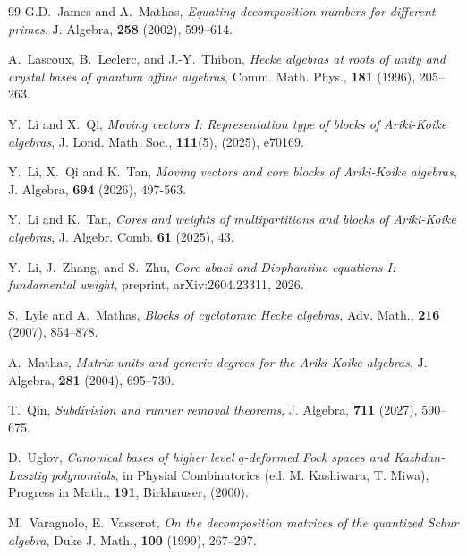 \documentclass[a4paper,10pt]{amsart}
\theoremstyle{plain}
\theoremstyle{plain}
\numberwithin{equation}{section}
\begin{document}
\begin{thebibliography}{99}
{\sc G.D.~James and A.~Mathas}, {\em Equating decomposition numbers for different primes}, {J. Algebra},  {\textbf{258}} (2002), 599--614.

{\sc A.~Lascoux, B.~Leclerc, and J.-Y.~Thibon}, {\em Hecke algebras at roots of unity and crystal bases of quantum affine
  algebras}, Comm. Math. Phys., {\bf 181} (1996), 205--263.

 {\sc Y.~Li and X.~Qi}, {\em Moving vectors I: Representation type of blocks of Ariki-Koike algebras},
J. Lond. Math. Soc., {\bf 111}(5), (2025), e70169.

 {\sc Y.~Li, X.~Qi and K.~Tan}, {\em Moving vectors and core blocks of Ariki-Koike
algebras}, {J. Algebra}, {\bf 694} (2026), 497-563.

{\sc Y.~Li and K.~Tan}, {\em Cores and weights of multipartitions and blocks of Ariki-Koike algebras}, {J. Algebr. Comb.} {\bf 61} (2025), 43.

{\sc Y.~Li, J.~Zhang, and S.~Zhu}, {\em Core abaci and Diophantine equations I: fundamental weight}, preprint, arXiv:2604.23311, 2026.

 {\sc S.~Lyle and A.~Mathas}, {\em Blocks of cyclotomic Hecke algebras}, Adv. Math., {\bf 216} (2007), 854--878.

 {\sc A.~Mathas},   {\em Matrix units and generic degrees for the Ariki-Koike algebras}, {J. Algebra,} {\bf 281} (2004), 695--730.

 {\sc T.~Qin},   {\em Subdivision and runner removal theorems}, {J. Algebra,} {\bf 711} (2027), 590--675.


 {\sc D.~Uglov}, {\em Canonical bases of higher level $q$-deformed Fock spaces and Kazhdan-Lusztig polynomials}, in Physial
Combinatorics (ed. M. Kashiwara, T. Miwa), Progress in Math., {\bf 191}, Birkhauser, (2000).

 {\sc M.~Varagnolo, E.~Vasserot}, {\em On the decomposition matrices of the quantized Schur algebra}, Duke
J. Math., {\bf 100} (1999), 267--297.
\end{thebibliography}
\end{document}
